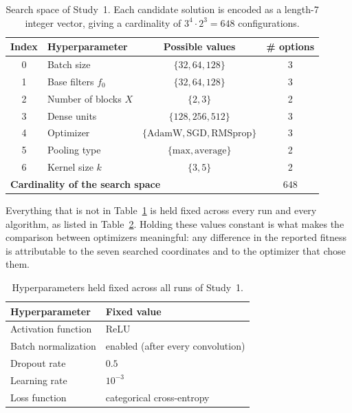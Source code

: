 \begin{table}[ht]
    \centering
    \caption{Search space of Study~1. Each candidate solution is encoded as a length-7 integer vector, giving a cardinality of $3^{4} \cdot 2^{3} = 648$ configurations.}
    \label{tab:search_space_study1}
    \begin{tabular}{clcc}
        \toprule
        \textbf{Index} & \textbf{Hyperparameter} & \textbf{Possible values} & \textbf{\# options} \\
        \midrule
        0 & Batch size              & $\{32, 64, 128\}$                & 3 \\
        1 & Base filters $f_0$      & $\{32, 64, 128\}$                & 3 \\
        2 & Number of blocks $X$    & $\{2, 3\}$                       & 2 \\
        3 & Dense units             & $\{128, 256, 512\}$              & 3 \\
        4 & Optimizer               & $\{\text{AdamW}, \text{SGD}, \text{RMSprop}\}$ & 3 \\
        5 & Pooling type            & $\{\text{max}, \text{average}\}$ & 2 \\
        6 & Kernel size $k$         & $\{3, 5\}$                       & 2 \\
        \midrule
        \multicolumn{3}{l}{\textbf{Cardinality of the search space}} & $648$ \\
        \bottomrule
    \end{tabular}
\end{table}

Everything that is not in Table~\ref{tab:search_space_study1} is held fixed across every run and every algorithm, as listed in Table~\ref{tab:fixed_hyperparams}. Holding these values constant is what makes the comparison between optimizers meaningful: any difference in the reported fitness is attributable to the seven searched coordinates and to the optimizer that chose them.

\begin{table}[ht]
    \centering
    \caption{Hyperparameters held fixed across all runs of Study~1.}
    \label{tab:fixed_hyperparams}
    \begin{tabular}{ll}
        \toprule
        \textbf{Hyperparameter} & \textbf{Fixed value} \\
        \midrule
        Activation function          & ReLU \\
        Batch normalization          & enabled (after every convolution) \\
        Dropout rate                 & $0.5$ \\
        Learning rate                & $10^{-3}$ \\
        Loss function                & categorical cross-entropy \\
        \bottomrule
    \end{tabular}
\end{table}

